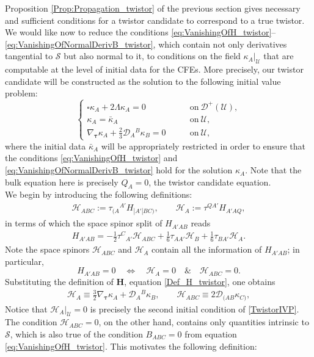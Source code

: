 \documentclass[10pt,a4paper]{article}
\theoremstyle{plain}
\def\bmH{{\bm H}}
\begin{document}
Proposition \ref{Prop:Propagation_twistor} of the previous section
gives necessary and sufficient conditions for a twistor candidate to
correspond to a true twistor. We would like now to reduce the
conditions
\eqref{eq:VanishingOfH_twistor}--\eqref{eq:VanishingOfNormalDerivB_twistor},
which contain not only derivatives tangential to $\mathcal{S}$ but
also normal to it, to conditions on the field
$\kappa_A|_{\mathcal{U}}$ that are computable at the level of initial
data for the CFEs. More precisely, our twistor candidate will be constructed as the
solution to the following initial value problem:
\begin{equation}\label{TwistorIVP}
    \left\{
\begin{array}{ll}
	 \square \kappa_A + 2\Lambda \kappa_A=0 & \qquad
         \text{on}~\mathcal{D}^{+}(\mathcal{U}),\\ \kappa_A =
         \bar{\kappa}_A
         &\qquad\text{on}~\mathcal{U},\\ \nabla_{\bm\tau} \kappa_{A} +
         \tfrac{2}{3}\mathcal{D}_{A}{}^{B}\kappa_{B}=0
         &\qquad\text{on}~\mathcal{U},
\end{array} \right.
\end{equation}
where the initial data $\bar{\kappa}_A$ will be appropriately
restricted in order to ensure that the conditions
\eqref{eq:VanishingOfH_twistor} and
\eqref{eq:VanishingOfNormalDerivB_twistor} hold for the solution
$\kappa_A$. Note that the bulk equation here is precisely $Q_A=0$, the
twistor candidate equation.  \\

We begin by introducing the following definitions:
\begin{align}
  \mathcal{H} _{ABC} := \tau _{(A}{}^{A'}H_{|A'|BC)}, \qquad
  \mathcal{H}_{A} := \tau^{QA'} H_{A'AQ},
\end{align}
in terms of which the space spinor split of $H_{A'AB}$ reads
\begin{align}
  H_{A'AB} = - \tfrac{1}{2} \tau ^{C}{}_{A'} \mathcal{H} _{ABC} +
  \tfrac{1}{6} \tau_{AA'} \mathcal{H}_{B} + \tfrac{1}{6} \tau_{BA'}
  \mathcal{H}_{A}.
\end{align}
Note the space spinors $\mathcal{H} _{ABC}$ and $\mathcal{H}_{A}$
contain all the information of $H_{A'AB}$; in particular,
\[
H_{A'AB}=0 \quad                 
\iff \quad \mathcal{H} _{A}=0    
\quad
\& \quad \mathcal{H}_{ABC}=0.  
\]
Substituting the definition of $\bmH$, equation \eqref{Def_H_twistor},
one obtains
\begin{align}\label{spacespinordecompHtotwistorders}
\mathcal{H} _{A} \equiv \tfrac{3}{2} \nabla_{\bm\tau} \kappa_{A} +
\mathcal{D} _{A}{}^B\kappa_{B}, \qquad \mathcal{H} _{ABC} \equiv 2
\mathcal{D} _{(AB}\kappa _{C)},
\end{align}
Notice that $\mathcal{H}_A|_{\mathcal{U}}=0$ is precisely the second
initial condition of \eqref{TwistorIVP}. The condition
$\mathcal{H}_{ABC}=0$, on the other hand, contains only quantities
intrinsic to $\mathcal{S}$, which is also true of the condition
$B_{ABC}=0$ from equation \eqref{eq:VanishingOfH_twistor}.
This motivates the following definition:
\end{document}
